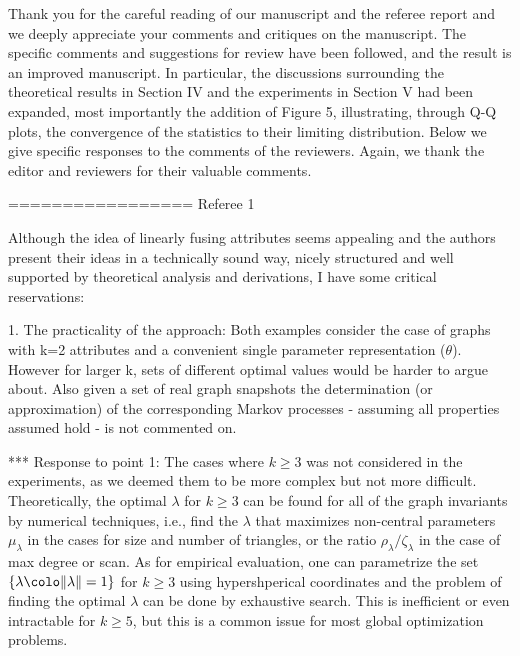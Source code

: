 Thank you for the careful reading of our manuscript and the referee
report and we deeply appreciate your comments and critiques on the
manuscript. The specific comments and suggestions for review have been
followed, and the result is an improved manuscript. In particular,
the discussions surrounding the theoretical results in Section IV and
the experiments in Section V had been expanded, most importantly the
addition of Figure 5, illustrating, through Q-Q plots, 
the convergence of the statistics to their limiting distribution. Below we
give specific responses to the comments of the reviewers.  Again, we
thank the editor and reviewers for their valuable comments.

=================
Referee 1

Although the idea of linearly fusing attributes seems appealing and
the authors present their ideas in a technically sound way, nicely
structured and well supported by theoretical analysis and derivations,
I have some critical reservations:

1. The practicality of the approach: Both examples consider the case
of graphs with k=2 attributes and a convenient single parameter
representation ($\theta$). However for larger k, sets of different
optimal values would be harder to argue about. Also given a set of
real graph snapshots the determination (or approximation) of the
corresponding Markov processes - assuming all properties assumed hold
- is not commented on.

*** Response to point 1:
    The cases where $ k \geq 3$ was not considered in the experiments,
    as we deemed them to be more complex but not more
    difficult. Theoretically, the optimal $\lambda$ for $k \geq 3$ can
    be found for all of the graph invariants by numerical techniques,
    i.e., find the $\lambda$ that maximizes non-central parameters
    $\mu_{\lambda}$ in the cases for size and number of triangles, or
    the ratio $\rho_{\lambda}/\zeta_{\lambda}$ in the case of max
    degree or scan. As for empirical evaluation, one can parametrize 
    the set $\{\lambda \colo \| \lambda \| = 1\}$ for $k \geq 3$
    using hypershperical coordinates and the problem of finding the
    optimal $\lambda$ can be done by exhaustive search. This is 
    inefficient or even intractable for $k \geq 5$, but this is a
    common issue for most global optimization problems. 
    

